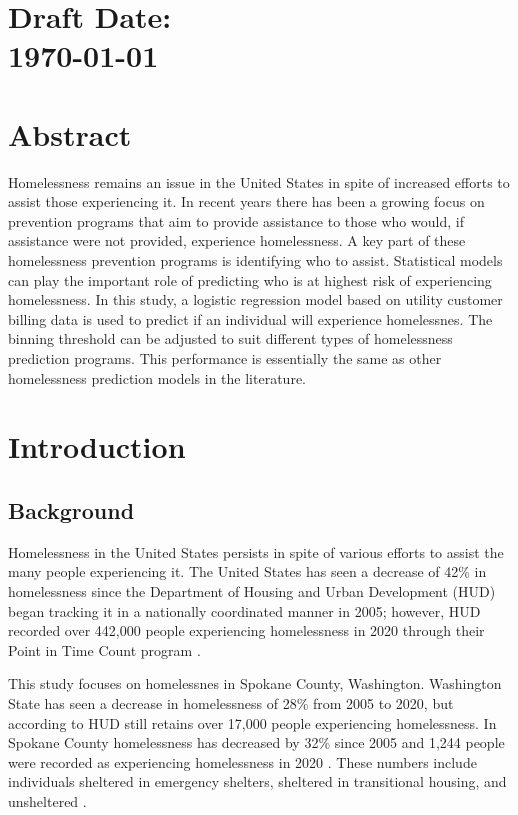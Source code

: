 \documentclass[12pt]{report}
\begin{document}
\chapter*{Draft Date: \\ \today \\ \currenttime}
\newpage

\chapter{Abstract}
Homelessness remains an issue in the United States in spite of increased efforts to assist those experiencing it. In recent years there has been a growing focus on prevention programs that aim to provide assistance to those who would, if assistance were not provided, experience homelessness. A key part of these homelessness prevention programs is identifying who to assist. Statistical models can play the important role of predicting who is at highest risk of experiencing homelessness. In this study, a logistic regression model based on utility customer billing data is used to predict if an individual will experience homelessnes. The binning threshold can be adjusted to suit different types of homelessness prediction programs. This performance is essentially the same as other homelessness prediction models in the literature.

\chapter{Introduction}
\section{Background}
Homelessness in the United States persists in spite of various efforts to assist the many people experiencing it. The United States has seen a decrease of 42\% in homelessness since the Department of Housing and Urban Development (HUD) began tracking it in a nationally coordinated manner in 2005; however, HUD recorded over 442,000 people experiencing homelessness in 2020 through their Point in Time Count program \cite{PITcount}. 

This study focuses on homelessnes in Spokane County, Washington. Washington State has seen a decrease in homelessness of 28\% from 2005 to 2020, but according to HUD still retains over 17,000 people experiencing homelessness. In Spokane County homelessness has decreased by 32\% since 2005 and 1,244 people were recorded as experiencing homelessness in 2020 \cite{PITcount}. These numbers include individuals sheltered in emergency shelters, sheltered in transitional housing, and unsheltered \cite{PITcount}.
\end{document}
